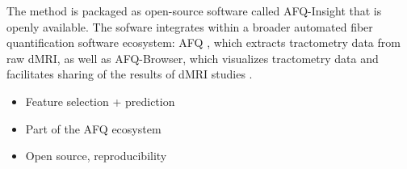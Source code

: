 The method is packaged as open-source software called AFQ-Insight that is openly
available. The sofware integrates within a broader automated fiber
quantification software ecosystem: AFQ \cite{yeatman2012tract}, which extracts
tractometry data from raw dMRI, as well as AFQ-Browser, which visualizes
tractometry data and facilitates sharing of the results of dMRI studies
\cite{yeatman2018browser}.

\begin{itemize}
  \item Feature selection + prediction
  \item Part of the AFQ ecosystem
  \item Open source, reproducibility
\end{itemize}
